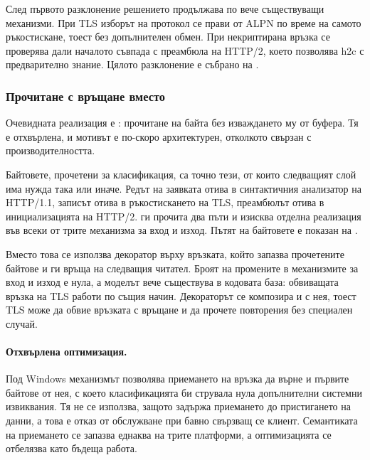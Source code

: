 След първото разклонение решението продължава по вече съществуващи механизми. При TLS
изборът на протокол се прави от ALPN \cite{rfc7301} по време на самото ръкостискане, тоест
без допълнителен обмен. При некриптирана връзка се проверява дали началото съвпада с
преамбюла на HTTP/2, което позволява h2c с предварително знание. Цялото разклонение е събрано на .



\subsubsection{Прочитане с връщане вместо }

Очевидната реализация е : прочитане на байта без изваждането му от
буфера. Тя е отхвърлена, и мотивът е по-скоро архитектурен, отколкото свързан с
производителността.

Байтовете, прочетени за класификация, са точно тези, от които следващият слой има нужда
така или иначе. Редът на заявката отива в синтактичния анализатор на HTTP/1.1, записът
 отива в ръкостискането на TLS, преамбюлът отива в инициализацията на
HTTP/2.  ги прочита два пъти и изисква отделна реализация във всеки от
трите механизма за вход и изход. Пътят на байтовете е показан на .



Вместо това се използва декоратор върху връзката, който запазва прочетените байтове и ги
връща на следващия читател. Броят на промените в механизмите за вход и изход е нула, а
моделът вече съществува в кодовата база: обвиващата връзка на TLS работи по същия начин.
Декораторът се композира и с нея, тоест TLS може да обвие връзката с връщане и да прочете
повторения  без специален случай.

\paragraph{Отхвърлена оптимизация.} Под Windows механизмът  позволява
приемането на връзка да върне и първите байтове от нея, с което класификацията би струвала
нула допълнителни системни извиквания. Тя не се използва, защото задържа приемането до
пристигането на данни, а това е отказ от обслужване при бавно свързващ се клиент.
Семантиката на приемането се запазва еднаква на трите платформи, а оптимизацията се
отбелязва като бъдеща работа.

